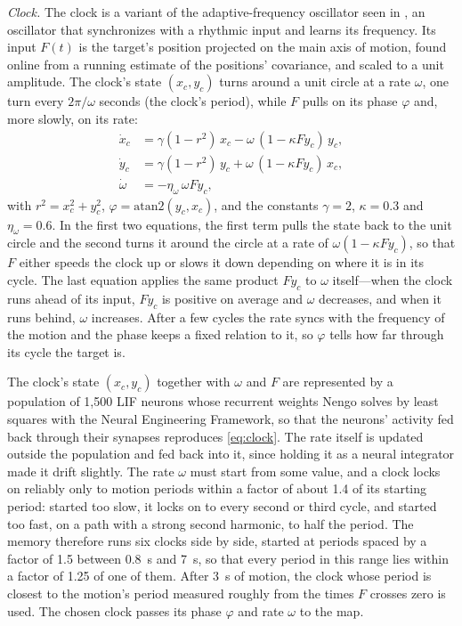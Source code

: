 \documentclass[conference]{IEEEtran}
\begin{document}
\emph{Clock.} The clock is a variant of the adaptive-frequency oscillator seen in \cite{Righetti2006Dynamic}, an oscillator that synchronizes with a rhythmic input and learns its frequency. Its input $F(t)$ is the target's position projected on the main axis of motion, found online from a running estimate of the positions' covariance, and scaled to a unit amplitude. The clock's state $(x_c, y_c)$ turns around a unit circle at a rate $\omega$, one turn every $2\pi/\omega$ seconds (the clock's period), while $F$ pulls on its phase $\varphi$ and, more slowly, on its rate:
\begin{align}
\dot{x}_c &= \gamma(1-r^2)\,x_c - \omega\,(1-\kappa F y_c)\,y_c, \nonumber\\
\dot{y}_c &= \gamma(1-r^2)\,y_c + \omega\,(1-\kappa F y_c)\,x_c, \label{eq:clock}\\
\dot{\omega} &= -\eta_\omega\,\omega F y_c, \nonumber
\end{align}
with $r^2 = x_c^2 + y_c^2$, $\varphi = \mathrm{atan2}(y_c, x_c)$, and the constants $\gamma = 2$, $\kappa = 0.3$ and $\eta_\omega = 0.6$. In the first two equations, the first term pulls the state back to the unit circle and the second turns it around the circle at a rate of $\omega(1-\kappa F y_c)$, so that $F$ either speeds the clock up or slows it down depending on where it is in its cycle. The last equation applies the same product $F y_c$ to $\omega$ itself---when the clock runs ahead of its input, $F y_c$ is positive on average and $\omega$ decreases, and when it runs behind, $\omega$ increases. After a few cycles the rate syncs with the frequency of the motion and the phase keeps a fixed relation to it, so $\varphi$ tells how far through its cycle the target is.

The clock's state $(x_c, y_c)$ together with $\omega$ and $F$ are represented by a population of 1,500 LIF neurons whose recurrent weights Nengo solves by least squares with the Neural Engineering Framework, so that the neurons' activity fed back through their synapses reproduces \eqref{eq:clock}. The rate itself is updated outside the population and fed back into it, since holding it as a neural integrator made it drift slightly. The rate $\omega$ must start from some value, and a clock locks on reliably only to motion periods within a factor of about 1.4 of its starting period: started too slow, it locks on to every second or third cycle, and started too fast, on a path with a strong second harmonic, to half the period. The memory therefore runs six clocks side by side, started at periods spaced by a factor of 1.5 between 0.8~s and 7~s, so that every period in this range lies within a factor of 1.25 of one of them. After 3~s of motion, the clock whose period is closest to the motion's period measured roughly from the times $F$ crosses zero is used. The chosen clock passes its phase $\varphi$ and rate $\omega$ to the map.
\end{document}
